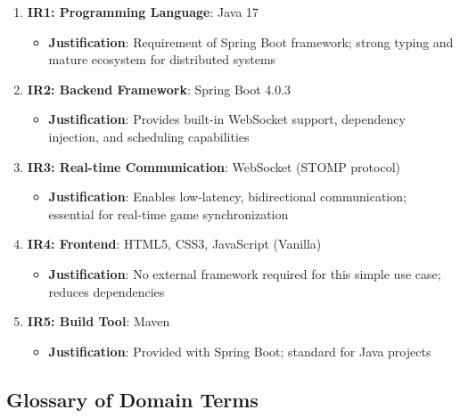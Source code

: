 \documentclass{scrartcl}
\begin{document}
\begin{enumerate}
  \item \textbf{IR1: Programming Language}: Java 17
  \begin{itemize}
    \item \textbf{Justification}: Requirement of Spring Boot framework;
      strong typing and mature ecosystem for distributed systems
  \end{itemize}

  \item \textbf{IR2: Backend Framework}: Spring Boot 4.0.3
  \begin{itemize}
    \item \textbf{Justification}: Provides built-in WebSocket support,
      dependency injection, and scheduling capabilities
  \end{itemize}

  \item \textbf{IR3: Real-time Communication}: WebSocket (STOMP protocol)
  \begin{itemize}
    \item \textbf{Justification}: Enables low-latency, bidirectional communication;
      essential for real-time game synchronization
  \end{itemize}

  \item \textbf{IR4: Frontend}: HTML5, CSS3, JavaScript (Vanilla)
  \begin{itemize}
    \item \textbf{Justification}: No external framework required for this simple use case;
      reduces dependencies
  \end{itemize}

  \item \textbf{IR5: Build Tool}: Maven
  \begin{itemize}
    \item \textbf{Justification}: Provided with Spring Boot; standard for Java projects
  \end{itemize}
\end{enumerate}

\subsection{Glossary of Domain Terms}
\end{document}
